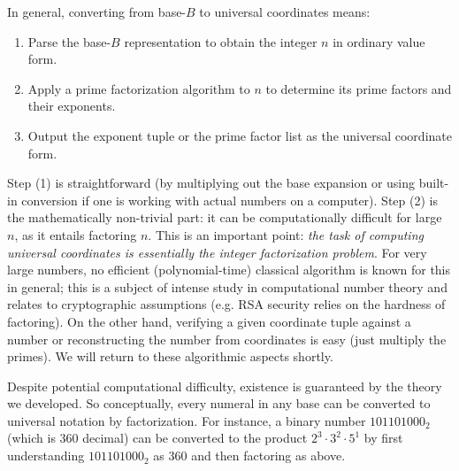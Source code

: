 \documentclass[11pt]{article}
\begin{document}
In general, converting from base-$B$ to universal coordinates means:
\begin{enumerate}
    \item Parse the base-$B$ representation to obtain the integer $n$ in ordinary value form.
    \item Apply a prime factorization algorithm to $n$ to determine its prime factors and their exponents.
    \item Output the exponent tuple or the prime factor list as the universal coordinate form.
\end{enumerate}
Step (1) is straightforward (by multiplying out the base expansion or using built-in conversion if one is working with actual numbers on a computer). Step (2) is the mathematically non-trivial part: it can be computationally difficult for large $n$, as it entails factoring $n$. This is an important point: \emph{the task of computing universal coordinates is essentially the integer factorization problem}. For very large numbers, no efficient (polynomial-time) classical algorithm is known for this in general; this is a subject of intense study in computational number theory and relates to cryptographic assumptions (e.g. RSA security relies on the hardness of factoring). On the other hand, verifying a given coordinate tuple against a number or reconstructing the number from coordinates is easy (just multiply the primes). We will return to these algorithmic aspects shortly.

Despite potential computational difficulty, existence is guaranteed by the theory we developed. So conceptually, every numeral in any base can be converted to universal notation by factorization. For instance, a binary number $101101000_2$ (which is 360 decimal) can be converted to the product $2^3\cdot3^2\cdot5^1$ by first understanding $101101000_2$ as 360 and then factoring as above.
\end{document}
